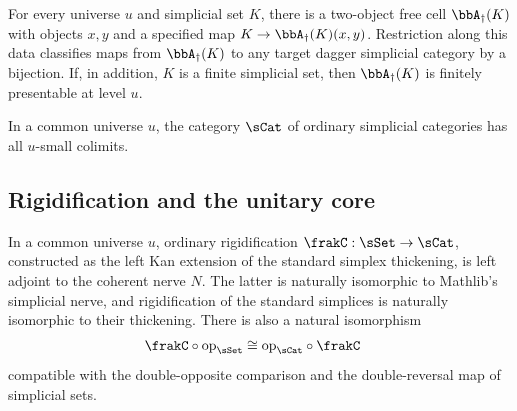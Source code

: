 \begin{resultblock}
\begin{theorem}
For every universe $u$ and simplicial set $K$, there is a two-object free cell $\bbA_{\dag}(K)$ with objects $x,y$ and a specified map $K\to\bbA_{\dag}(K)(x,y)$.
Restriction along this data classifies maps from $\bbA_{\dag}(K)$ to any target dagger simplicial category by a bijection.
If, in addition, $K$ is a finite simplicial set, then $\bbA_{\dag}(K)$ is finitely presentable at level $u$.
\end{theorem}
\end{resultblock}

\begin{resultblock}
\begin{theorem}
In a common universe $u$, the category $\sCat$ of ordinary simplicial categories has all $u$-small colimits.
\end{theorem}
\end{resultblock}

\subsection{Rigidification and the unitary core}

\begin{resultblock}
\begin{theorem}
In a common universe $u$, ordinary rigidification $\frakC:\sSet\to\sCat$, constructed as the left Kan extension of the standard simplex thickening, is left adjoint to the coherent nerve $N$.
The latter is naturally isomorphic to Mathlib's simplicial nerve, and rigidification of the standard simplices is naturally isomorphic to their thickening.
There is also a natural isomorphism
\begin{align}
  \frakC\circ\mathrm{op}_{\sSet}
    &\cong \mathrm{op}_{\sCat}\circ\frakC
\end{align}
compatible with the double-opposite comparison and the double-reversal map of simplicial sets.
\end{theorem}
\end{resultblock}

